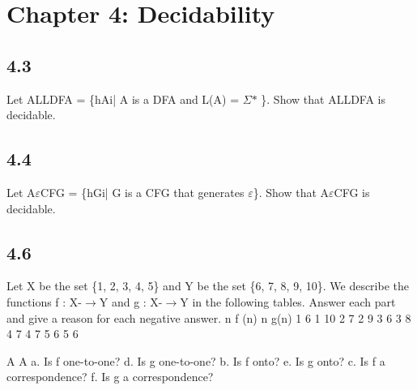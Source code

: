 \section{Chapter 4: Decidability}

\subsection*{4.3}

Let ALLDFA = \{hAi| A is a DFA and L(A) = $\Sigma$$\ast$ \}. Show that ALLDFA is decidable.


\subsection*{4.4}

Let A$\varepsilon$CFG = \{hGi| G is a CFG that generates $\varepsilon$\}. Show that A$\varepsilon$CFG is decidable.


\subsection*{4.6}
\begingroup
\small
\ttfamily
\obeylines
\obeyspaces
Let X be the set \{1, 2, 3, 4, 5\} and Y be the set \{6, 7, 8, 9, 10\}. We describe the
                      functions f : X-$\to$Y and g : X-$\to$Y in the following tables. Answer each part
                      and give a reason for each negative answer.
                                                                n        f (n)                                             n        g(n)
                                                                1          6                                               1         10
                                                                2          7                                               2         9
                                                                3          6                                               3         8
                                                                4          7                                               4         7
                                                                5          6                                               5         6

                            A                                                                             A
                              a. Is f one-to-one?                                                             d. Is g one-to-one?
                              b. Is f onto?                                                                   e. Is g onto?
                              c. Is f a correspondence?                                                       f. Is g a correspondence?
\endgroup


